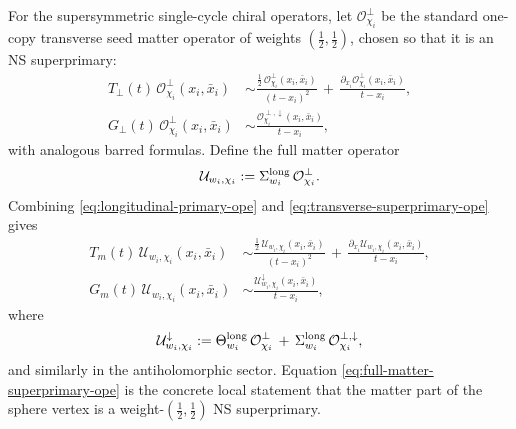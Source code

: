 \documentclass[11pt]{article}
\newcommand{\mc}[1]{\mathcal{#1}}
\begin{document}
For the supersymmetric single-cycle chiral operators, let $\mc O_{\chi_i}^\perp$ be the standard one-copy transverse seed matter operator of weights $(\tfrac12,\tfrac12)$, chosen so that it is an NS superprimary:
\begin{equation}\label{eq:transverse-superprimary-ope}
\begin{aligned}
T_\perp(t)\,\mc O_{\chi_i}^\perp(x_i,\bar x_i)
&\sim
\frac{\tfrac12\,\mc O_{\chi_i}^\perp(x_i,\bar x_i)}{(t-x_i)^2}
\,+\,
\frac{\partial_{x_i}\mc O_{\chi_i}^\perp(x_i,\bar x_i)}{t-x_i},
\\
G_\perp(t)\,\mc O_{\chi_i}^\perp(x_i,\bar x_i)
&\sim
\frac{\mc O_{\chi_i}^{\perp,\downarrow}(x_i,\bar x_i)}{t-x_i},
\end{aligned}
\end{equation}
with analogous barred formulas. Define the full matter operator
\begin{equation}\label{eq:full-matter-superprimary}
\mc U_{w_i,\chi_i}
:=
\Sigma^{\rm long}_{w_i}\,\mc O_{\chi_i}^\perp.
\end{equation}
Combining \eqref{eq:longitudinal-primary-ope} and \eqref{eq:transverse-superprimary-ope} gives
\begin{equation}\label{eq:full-matter-superprimary-ope}
\begin{aligned}
T_m(t)\,\mc U_{w_i,\chi_i}(x_i,\bar x_i)
&\sim
\frac{\tfrac12\,\mc U_{w_i,\chi_i}(x_i,\bar x_i)}{(t-x_i)^2}
\,+\,
\frac{\partial_{x_i}\mc U_{w_i,\chi_i}(x_i,\bar x_i)}{t-x_i},
\\
G_m(t)\,\mc U_{w_i,\chi_i}(x_i,\bar x_i)
&\sim
\frac{\mc U_{w_i,\chi_i}^{\downarrow}(x_i,\bar x_i)}{t-x_i},
\end{aligned}
\end{equation}
where
\begin{equation}\label{eq:full-matter-superdescendant}
\mc U_{w_i,\chi_i}^{\downarrow}
:=
\Theta^{\rm long}_{w_i}\,\mc O_{\chi_i}^\perp
\,+\,
\Sigma^{\rm long}_{w_i}\,\mc O_{\chi_i}^{\perp,\downarrow},
\end{equation}
and similarly in the antiholomorphic sector. Equation \eqref{eq:full-matter-superprimary-ope} is the concrete local statement that the matter part of the sphere vertex is a weight-$(\tfrac12,\tfrac12)$ NS superprimary.
\end{document}
